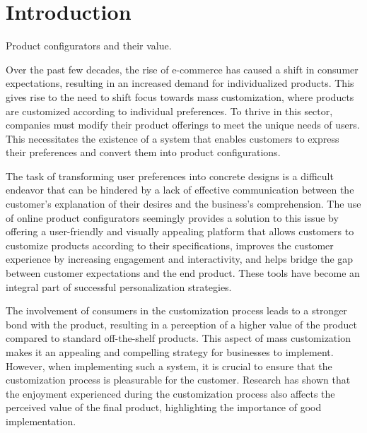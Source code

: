 \chapter*{Introduction}
\setcounter{page}{1}

\begin{chapterabstract}
	Product configurators and their value.
\end{chapterabstract}

Over the past few decades, the rise of e-commerce has caused a shift in consumer expectations, resulting in an increased demand for individualized products. This gives rise to the need to shift focus towards mass customization, where products are customized according to individual preferences. To thrive in this sector, companies must modify their product offerings to meet the unique needs of users. This necessitates the existence of a system that enables customers to express their preferences and convert them into product configurations. \cite{Fulkerson2000}

The task of transforming user preferences into concrete designs is a difficult endeavor that can be hindered by a lack of effective communication between the customer's explanation of their desires and the business's comprehension. The use of online product configurators seemingly provides a solution to this issue by offering a user-friendly and visually appealing platform that allows customers to customize products according to their specifications, improves the customer experience by increasing engagement and interactivity, and helps bridge the gap between customer expectations and the end product. These tools have become an integral part of successful personalization strategies. \cite{Franke2003}

The involvement of consumers in the customization process leads to a stronger bond with the product, resulting in a perception of a higher value of the product compared to standard off-the-shelf products. This aspect of mass customization makes it an appealing and compelling strategy for businesses to implement. \cite{Schreier2006} However, when implementing such a system, it is crucial to ensure that the customization process is pleasurable for the customer. Research has shown that the enjoyment experienced during the customization process also affects the perceived value of the final product, highlighting the importance of good implementation. \cite{Franke2010}

